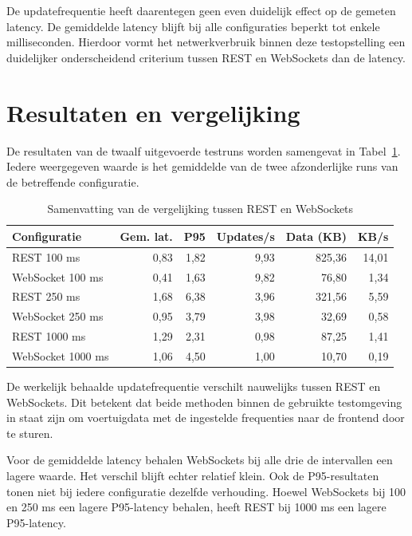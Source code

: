 De updatefrequentie heeft daarentegen geen even duidelijk effect op de gemeten
latency. De gemiddelde latency blijft bij alle configuraties beperkt tot enkele
milliseconden. Hierdoor vormt het netwerkverbruik binnen deze testopstelling
een duidelijker onderscheidend criterium tussen REST en WebSockets dan de
latency.


\section{Resultaten en vergelijking}

De resultaten van de twaalf uitgevoerde testruns worden samengevat in
Tabel~\ref{tab:rest-websocket-overzicht}. Iedere weergegeven waarde is het
gemiddelde van de twee afzonderlijke runs van de betreffende configuratie.

\begin{table}[H]
    \centering
    \caption{Samenvatting van de vergelijking tussen REST en WebSockets}
    \label{tab:rest-websocket-overzicht}
    \begin{tabular}{lrrrrr}
        \hline
        \textbf{Configuratie} &
        \textbf{Gem. lat.} &
        \textbf{P95} &
        \textbf{Updates/s} &
        \textbf{Data (KB)} &
        \textbf{KB/s} \\
        \hline
        REST 100 ms        & 0,83 & 1,82 & 9,93 & 825,36 & 14,01 \\
        WebSocket 100 ms   & 0,41 & 1,63 & 9,82 & 76,80  & 1,34 \\
        REST 250 ms        & 1,68 & 6,38 & 3,96 & 321,56 & 5,59 \\
        WebSocket 250 ms   & 0,95 & 3,79 & 3,98 & 32,69  & 0,58 \\
        REST 1000 ms       & 1,29 & 2,31 & 0,98 & 87,25  & 1,41 \\
        WebSocket 1000 ms  & 1,06 & 4,50 & 1,00 & 10,70  & 0,19 \\
        \hline
    \end{tabular}
\end{table}

De werkelijk behaalde updatefrequentie verschilt nauwelijks tussen REST en
WebSockets. Dit betekent dat beide methoden binnen de gebruikte testomgeving
in staat zijn om voertuigdata met de ingestelde frequenties naar de frontend
door te sturen.

Voor de gemiddelde latency behalen WebSockets bij alle drie de intervallen een
lagere waarde. Het verschil blijft echter relatief klein. Ook de P95-resultaten
tonen niet bij iedere configuratie dezelfde verhouding. Hoewel WebSockets bij
100 en 250 ms een lagere P95-latency behalen, heeft REST bij 1000 ms een lagere
P95-latency.

